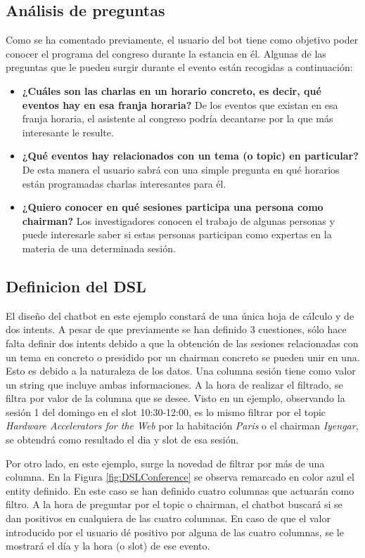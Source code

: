 \subsection{Análisis de preguntas}

Como se ha comentado previamente, el usuario del bot tiene como objetivo poder conocer el programa del congreso durante la estancia en él. Algunas de las preguntas que le pueden surgir durante el evento están recogidas a continuación:
\begin{itemize}
	\item \textbf{¿Cuáles son las charlas en un horario concreto, es decir, qué eventos hay en esa franja horaria?} De los eventos que existan en esa franja horaria, el asistente al congreso podría decantarse por la que más interesante le resulte.
	\item \textbf{¿Qué eventos hay relacionados con un tema (o topic) en particular?} De esta manera el usuario sabrá con una simple pregunta en qué horarios están programadas charlas interesantes para él.
	\item \textbf{¿Quiero conocer en qué sesiones participa una persona como chairman?} Los investigadores conocen el trabajo de algunas personas y puede interesarle saber si estas personas participan como expertas en la materia de una determinada sesión.
\end{itemize}

\subsection{Definicion del DSL}

El diseño del chatbot en este ejemplo constará de una única hoja de cálculo y de dos intents. A pesar de que previamente se han definido 3 cuestiones, sólo hace falta definir dos intents debido a que la obtención de las sesiones relacionadas con un tema en concreto o presidido por un chairman concreto se pueden unir en una. Esto es debido a la naturaleza de los datos. Una columna sesión tiene como valor un string que incluye ambas informaciones. A la hora de realizar el filtrado, se filtra por valor de la columna que se desee. Visto en un ejemplo, observando la sesión 1 del domingo en el slot 10:30-12:00, es lo mismo filtrar por el topic \emph{Hardware Accelerators for the Web} por la habitación \emph{Paris} o el chairman \emph{Iyengar}, se obtendrá como resultado el dia y slot de esa sesión.

Por otro lado, en este ejemplo, surge la novedad de filtrar por más de una columna. En la Figura \ref{fig:DSLConference} se observa remarcado en color azul el entity definido. En este caso se han definido cuatro columnas que actuarán como filtro. A la hora de preguntar por el topic o chairman, el chatbot buscará si se dan positivos en cualquiera de las cuatro columnas. En caso de que el valor introducido por el usuario dé positivo por alguna de las cuatro columnas, se le mostrará el día y la hora (o slot) de ese evento.

